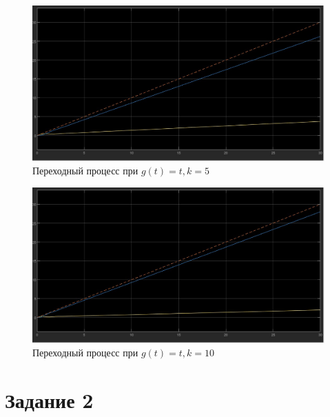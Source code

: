 \documentclass[a4paper, 12pt]{article}
\begin{document}
    \begin{figure}[H]
        \centering
        \includegraphics[scale=0.3]{task_1_g=t_k=5.jpg}
        \captionsetup{skip=0pt}
        \caption{Переходный процесс при $g(t)=t,k=5$}
        \label{fig:t1gtk5}
    \end{figure}
    \begin{figure}[H]
        \centering
        \includegraphics[scale=0.3]{task_1_g=t_k=10.jpg}
        \captionsetup{skip=0pt}
        \caption{Переходный процесс при $g(t)=t,k=10$}
        \label{fig:t1gtk10}
    \end{figure}
    

    \section{Задание 2}
\end{document}
